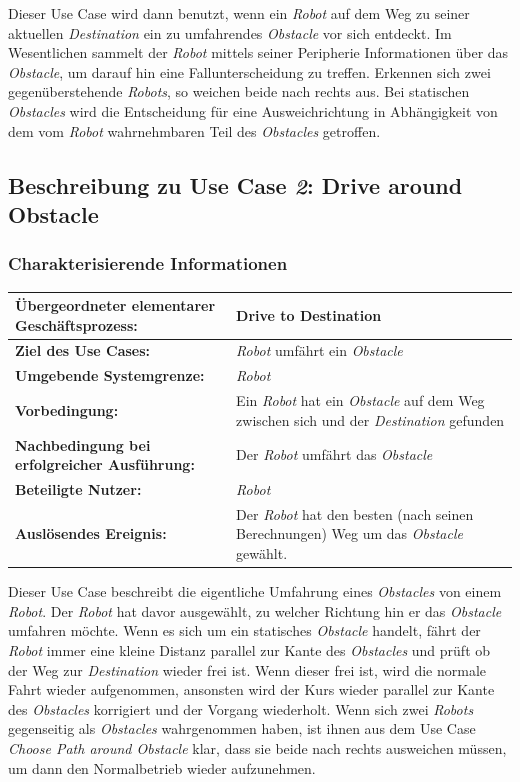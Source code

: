 			Dieser Use Case wird dann benutzt, wenn ein \emph{Robot} auf dem Weg zu seiner aktuellen \emph{Destination} ein zu umfahrendes \emph{Obstacle} vor sich entdeckt. 
			Im Wesentlichen sammelt der \emph{Robot} mittels seiner Peripherie Informationen über das \emph{Obstacle}, um darauf hin eine Fallunterscheidung zu treffen. 
			Erkennen sich zwei gegenüberstehende \emph{Robots}, so weichen beide nach rechts aus. 
			Bei statischen \emph{Obstacles} wird die Entscheidung für eine Ausweichrichtung in Abhängigkeit von dem vom \emph{Robot} wahrnehmbaren Teil des \emph{Obstacles} getroffen.
		
		\pagebreak
		
		
		\subsection{Beschreibung zu Use Case \emph{2}: Drive around Obstacle}

			\subsubsection*{Charakterisierende Informationen}

			\begin{table}[H]
				\centering
				\begin{tabularx}{\textwidth}{|p{5cm}|X|}
				\hline
				\textbf{Übergeordneter elementarer Geschäftsprozess:} & Drive to Destination\\ \hline
				\textbf{Ziel des Use Cases:} & \emph{Robot} umfährt ein \emph{Obstacle} \\ \hline
				\textbf{Umgebende Systemgrenze:} & \emph{Robot} \\ \hline
				\textbf{Vorbedingung:} & Ein \emph{Robot} hat ein \emph{Obstacle} auf dem Weg zwischen sich und der \emph{Destination} gefunden\\ \hline
				\textbf{Nachbedingung bei erfolgreicher Ausführung:} & 
				Der \emph{Robot} umfährt das \emph{Obstacle} \\ \hline
				\textbf{Beteiligte Nutzer:} & \emph{Robot} \\ \hline
				\textbf{Auslösendes Ereignis:} & Der \emph{Robot} hat den besten (nach seinen Berechnungen) Weg um das \emph{Obstacle} gewählt. \\ \hline
				\end{tabularx}
			\end{table}
		Dieser Use Case beschreibt die eigentliche Umfahrung eines \emph{Obstacles} von einem \emph{Robot}. 
		Der \emph{Robot} hat davor ausgewählt, zu welcher Richtung hin er das \emph{Obstacle} umfahren möchte. 
		Wenn es sich um ein statisches \emph{Obstacle} handelt, fährt der \emph{Robot} immer eine kleine Distanz parallel zur Kante des \emph{Obstacles} und prüft ob der Weg zur \emph{Destination} wieder frei ist. 
		Wenn dieser frei ist, wird die normale Fahrt wieder aufgenommen, ansonsten wird der Kurs wieder parallel zur Kante des \emph{Obstacles} korrigiert und der Vorgang wiederholt. 
		Wenn sich zwei \emph{Robots} gegenseitig als \emph{Obstacles} wahrgenommen haben, ist ihnen aus dem Use Case \textit{Choose Path around Obstacle} klar, dass sie beide nach rechts ausweichen müssen, um dann den Normalbetrieb wieder aufzunehmen.
			
